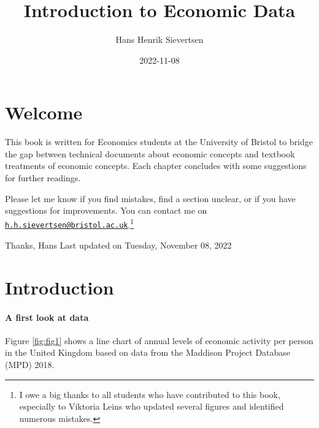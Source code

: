 \documentclass[
]{book}
\title{Introduction to Economic Data}
\author{Hans Henrik Sievertsen}
\date{2022-11-08}
\begin{document}
\maketitle

{
\setcounter{tocdepth}{1}
\tableofcontents
}
\hypertarget{welcome}{%
\chapter*{Welcome}\label{welcome}}

This book is written for Economics students at the University of Bristol to bridge the gap between technical documents about economic concepts and textbook treatments of economic concepts. Each chapter concludes with some suggestions for further readings.

Please let me know if you find mistakes, find a section unclear, or if you have suggestions for improvements. You can contact me on \href{mailto:h.h.sievertsen@bristol.ac.uk}{\nolinkurl{h.h.sievertsen@bristol.ac.uk}}.\footnote{I owe a big thanks to all students who have contributed to this book, especially to Viktoria Leins who updated several figures and identified numerous mistakes.}

Thanks,
Hans
Last updated on Tuesday, November 08, 2022

\hypertarget{introduction}{%
\chapter{Introduction}\label{introduction}}

\hypertarget{a-first-look-at-data}{%
\subsubsection*{A first look at data}\label{a-first-look-at-data}}

Figure \ref{fig:fig1} shows a line chart of annual levels of economic activity per person in the United Kingdom based on data from the Maddison Project Database (MPD) 2018.
\end{document}
